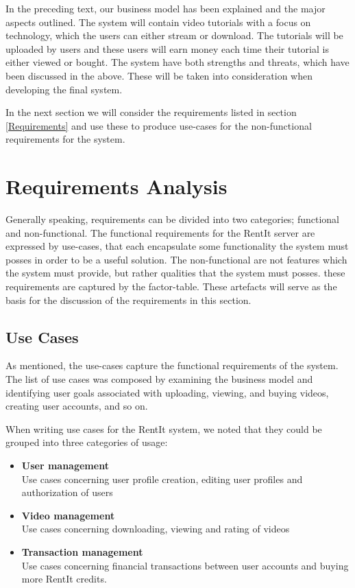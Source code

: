 In the preceding text, our business model has been explained and the major aspects outlined. The system will contain video tutorials with a focus on technology, which the users can either stream or download. The tutorials will be uploaded by users and these users will earn money each time their tutorial is either viewed or bought.
The system have both strengths and threats, which have been discussed in the above. These will be taken into consideration when developing the final system.

In the next section we will consider the requirements listed in section \ref{Requirements} and use these to produce use-cases for the non-functional requirements for the system. 

\section{Requirements Analysis}
Generally speaking, requirements can be divided into two categories; functional and non-functional. The functional requirements for the RentIt server are expressed by use-cases, that each encapsulate some functionality the system must posses in order to be a useful solution. The non-functional are not features which the system must provide, but rather qualities that the system must posses. these  requirements are captured by the factor-table.
  These artefacts will serve as the basis for the discussion of the requirements in this section.
  
\subsection{Use Cases}
As mentioned, the use-cases capture the functional requirements of the system. The list of use cases was composed by examining the business model and identifying user goals associated with uploading, viewing, and buying videos, creating user accounts, and so on.

When writing use cases for the RentIt system, we noted that they could be grouped into three categories of usage:
\begin{itemize}
\item \textbf{User management}\\
Use cases concerning user profile creation, editing user profiles and authorization of users
\item \textbf{Video management}\\
Use cases concerning downloading, viewing and rating of videos
\item \textbf{Transaction management}\\
Use cases concerning financial transactions between user accounts and buying more RentIt credits.
\end{itemize}


